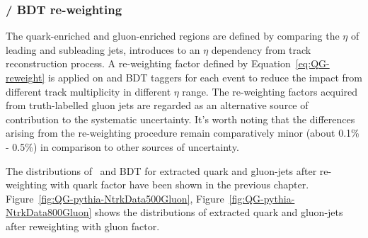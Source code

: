    \subsubsection{{\ntrk} / BDT re-weighting}
  The quark-enriched and gluon-enriched regions are defined by comparing the $\eta$ of leading and subleading jets, introduces to an $\eta$ dependency from track reconstruction process. A re-weighting factor defined by Equation~\ref{eq:QG-reweight} is applied on {\ntrk} and BDT taggers for each event to reduce the impact from different track multiplicity in different $\eta$ range. The re-weighting factors acquired from truth-labelled gluon jets are regarded as an alternative source of contribution to the systematic uncertainty. It's worth noting that the differences arising from the re-weighting procedure remain comparatively minor (about 0.1\% - 0.5\%) in comparison to other sources of uncertainty.
  
  
  The distributions of \ntrk~and BDT for extracted quark and gluon-jets after re-weighting with quark factor have been shown in the previous chapter. %
  Figure~\ref{fig:QG-pythia-NtrkData500Gluon},  Figure~\ref{fig:QG-pythia-NtrkData800Gluon} shows the distributions of extracted quark and gluon-jets after reweighting with gluon factor.
  
